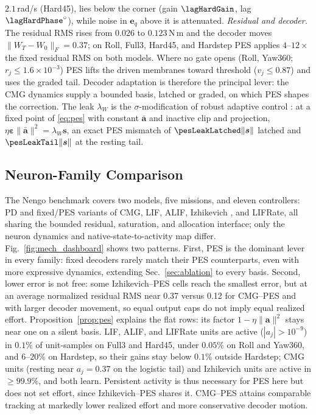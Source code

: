 \documentclass[letterpaper, 10 pt, conference]{ieeeconf}
\begin{document}
$2.1$\,rad/s (Hard45), lies below the corner (gain $\lagHardGain$, lag
$\lagHardPhase^\circ$), while noise in $\bm e_q$ above it is attenuated.
\emph{Residual and decoder.} The residual RMS rises from $0.026$ to
$0.123$\,N\,m and the decoder moves $\|W_T-W_0\|_F=0.37$; on Roll, Full3,
Hard45, and Hardstep PES applies $4$--$12\times$ the fixed residual RMS on
both models. Where no gate opens (Roll, Yaw360; $r_j\le1.6\times10^{-3}$)
PES lifts the driven membranes toward threshold ($v_j\le0.87$) and uses
the graded tail. Decoder adaptation is therefore the principal lever: the
CMG dynamics supply a bounded basis, latched or graded, on which PES
shapes the correction. The leak $\lambda_W$ is the $\sigma$-modification of
robust adaptive control \cite{ioannou1984sigma,ioannou1996robust}: at a fixed
point of \eqref{eq:pes} with constant $\bar{\bm a}$ and inactive clip and
projection, $\eta\bm\varepsilon\|\bar{\bm a}\|^2=\lambda_W\bm s$, an exact
PES mismatch of $\pesLeakLatched\|\bm s\|$ latched and $\pesLeakTail\|\bm s\|$
at the resting tail.

\subsection{Neuron-Family Comparison}
The Nengo benchmark covers two models, five missions, and eleven controllers: PD and fixed/PES variants of CMG, LIF, ALIF, Izhikevich \cite{izhikevich2003}, and LIFRate, all sharing the bounded residual, saturation, and allocation interface; only the neuron dynamics and native-state-to-activity map differ.
Fig.~\ref{fig:mech_dashboard} shows two patterns. First, PES is the
dominant lever in every family: fixed decoders rarely match their PES
counterparts, even with more expressive dynamics, extending
Sec.~\ref{sec:ablation} to every basis. Second, lower error is not free:
some Izhikevich--PES cells reach the smallest error, but at an average
normalized residual RMS near 0.37 versus 0.12 for CMG--PES and with larger
decoder movement, so equal output caps do not imply equal realized effort.
Proposition~\ref{prop:pes} explains the flat rows: its factor
$1-\eta\|\bm a\|^2$ stays near one on a silent basis. LIF, ALIF, and LIFRate
units are active ($|a_j|>10^{-9}$) in $0.1\%$ of unit-samples on Full3 and
Hard45, under $0.05\%$ on Roll and Yaw360, and $6$--$20\%$ on Hardstep, so
their gains stay below $0.1\%$ outside Hardstep; CMG units (resting near
$a_j=0.37$ on the logistic tail) and Izhikevich units are active in
${\ge}99.9\%$, and both learn. Persistent activity is thus
necessary for PES here but does not set effort, since Izhikevich--PES shares
it. CMG--PES attains comparable tracking at markedly lower realized effort
and more conservative decoder motion.
\end{document}
